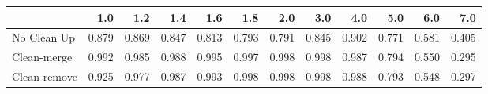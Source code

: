 \begin{tabular}{lrrrrrrrrrrr}
\toprule
{} &   1.0 &   1.2 &   1.4 &   1.6 &   1.8 &   2.0 &   3.0 &   4.0 &   5.0 &   6.0 &   7.0 \\
\midrule
No Clean Up  & 0.879 & 0.869 & 0.847 & 0.813 & 0.793 & 0.791 & 0.845 & 0.902 & 0.771 & 0.581 & 0.405 \\
Clean-merge  & 0.992 & 0.985 & 0.988 & 0.995 & 0.997 & 0.998 & 0.998 & 0.987 & 0.794 & 0.550 & 0.295 \\
Clean-remove & 0.925 & 0.977 & 0.987 & 0.993 & 0.998 & 0.998 & 0.998 & 0.988 & 0.793 & 0.548 & 0.297 \\
\bottomrule
\end{tabular}
